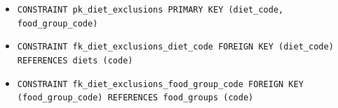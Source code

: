 \begin{itemize}
\item \raggedright {\small\texttt{CONSTRAINT pk\_\allowbreak{}\allowbreak{}diet\_\allowbreak{}\allowbreak{}exclusions PRIMARY KEY (diet\_\allowbreak{}\allowbreak{}code, food\_\allowbreak{}\allowbreak{}group\_\allowbreak{}\allowbreak{}code)}}
\item \raggedright {\small\texttt{CONSTRAINT fk\_\allowbreak{}\allowbreak{}diet\_\allowbreak{}\allowbreak{}exclusions\_\allowbreak{}\allowbreak{}diet\_\allowbreak{}\allowbreak{}code FOREIGN KEY (diet\_\allowbreak{}\allowbreak{}code) REFERENCES diets (code)}}
\item \raggedright {\small\texttt{CONSTRAINT fk\_\allowbreak{}\allowbreak{}diet\_\allowbreak{}\allowbreak{}exclusions\_\allowbreak{}\allowbreak{}food\_\allowbreak{}\allowbreak{}group\_\allowbreak{}\allowbreak{}code FOREIGN KEY (food\_\allowbreak{}\allowbreak{}group\_\allowbreak{}\allowbreak{}code) REFERENCES food\_\allowbreak{}\allowbreak{}groups (code)}}
\end{itemize}
